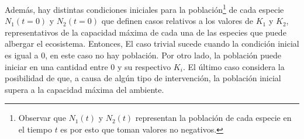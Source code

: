 \documentclass{article}
\begin{document}

Además, hay distintas condiciones iniciales para la población\footnote{Observar que \(N_1(t)\) y \(N_2(t)\) representan la población de cada especie en el tiempo \(t\) es por esto que toman valores no negativos.} de cada especie \(N_1(t = 0)\) y \(N_2(t = 0)\) que definen casos relativos a los valores de \(K_1\) y \(K_2\), representativos de la capacidad máxima de cada una de las especies que puede albergar el ecosistema. Entonces, El caso trivial sucede cuando la condición inicial es igual a 0, en este caso no hay población. Por otro lado, la población puede iniciar en una cantidad entre 0 y su respectivo \(K_i\). El último caso considera la posibilidad de que, a causa de algún tipo de intervención, la población inicial supera a la capacidad máxima del ambiente. 


\end{document}
